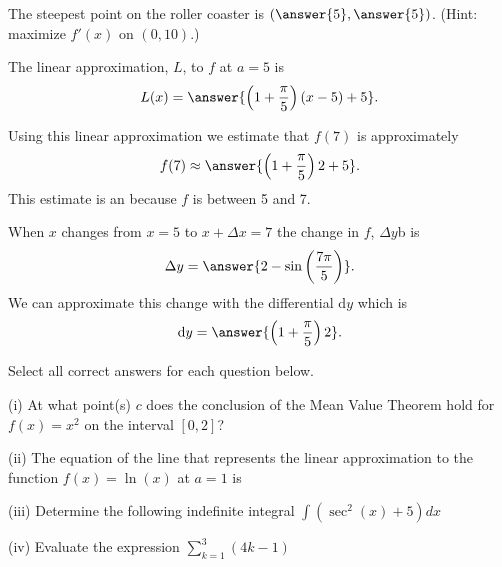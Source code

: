 \documentclass{ximera}
\begin{document}
\begin{exercise}
The steepest point on the roller coaster is $\left(\answer{5},\answer{5}\right)$. (Hint: maximize $f'(x)$ on $(0,10)$.)

The linear approximation, $L$, to $f$ at $a=5$ is
\[
L(x) = \answer{\left(1+\frac{\pi}{5}\right)(x-5) + 5}.
\]

Using this linear approximation we estimate that $f(7)$ is approximately
\[
f(7) \approx \answer{\left(1+\frac{\pi}{5}\right)2+5}.
\]
This estimate is an  because $f$ is  between 5 and 7.

When $x$ changes from $x=5$ to $x+\Delta x=7$ the change in $f$, $\Delta y$b is
\[
\Delta y = \answer{2-\sin\left(\frac{7\pi}{5}\right)}.
\]
We can approximate this change with the differential $\mathrm{d}y$ which is
\[
\mathrm{d}y = \answer{\left(1+\frac{\pi}{5}\right)2}.
\]
\end{exercise}

\begin{exercise}
Select all correct answers for each question below.

(i) At what point(s) $c$ does the conclusion of the Mean Value Theorem hold for $f(x)=x^2$ on the interval $[0,2]$?

\begin{selectAll}
\end{selectAll}

(ii) The equation of the line that represents the linear approximation to the function $f(x)=\ln(x)$ at $a=1$ is

\begin{selectAll}
\end{selectAll}

(iii) Determine the following indefinite integral $\int(\sec^2(x)+5)dx$

\begin{selectAll}
\end{selectAll}

(iv) Evaluate the expression $\sum_{k=1}^3(4k-1)$

\begin{selectAll}
\end{selectAll}
\end{exercise}
\end{document}
